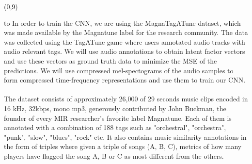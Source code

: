 \documentclass[a0]{a0poster}
\def\Head#1{
  \noindent\hbox to \hsize{\hfil{\LARGE\color{DarkBlue}\sf #1}}\bigskip}
\begin{document}
  \begin{textblock}{7}(0,9)
    \Head{Dataset}
    \sf
    In order to train the CNN, we are using the MagnaTagATune dataset, which
    was made available by the Magnatune label for the research community. The
    data was collected using the TagATune game where users annotated audio
    tracks with audio relevant tags. We will use audio annotations to obtain
    latent factor vectors and use these vectors as ground truth data to
    minimize the MSE of the predictions. We will use compressed mel-spectograms
    of the audio samples to form compressed time-frequency representations and
    use them to train our CNN.
    \\ \\
    The dataset consists of approximately 26,000 of 29 seconds music clips
    encoded in 16 kHz, 32kbps, mono mp3, generously contributed by John
    Buckman, the founder of every MIR researcher's favorite label Magnatune.
    Each of them is annotated with a combination of 188 tags such as "orchestral",
    "orchestra", "punk", "slow", "blues", "rock" etc. It also contains music
    similarity annotations in the form of triples where given a triple of songs
    (A, B, C), metrics of how many players have flagged the song A, B or C as
    most different from the others.

    \bigskip
  \end{textblock}
\end{document}
